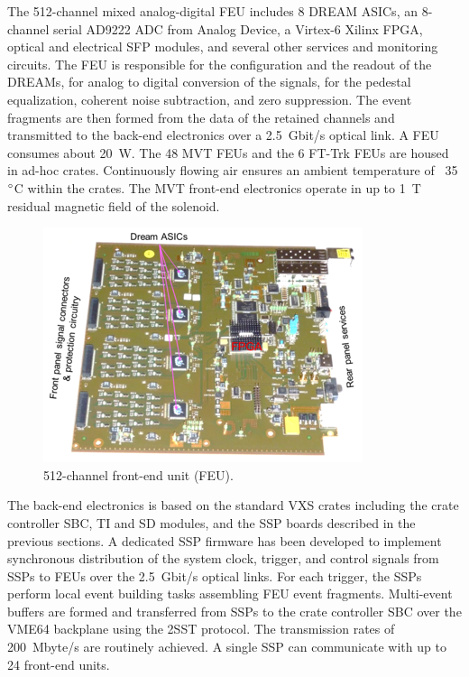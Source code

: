 The 512-channel mixed analog-digital FEU includes 8 DREAM ASICs, an 8-channel serial AD9222 ADC from Analog Device, a Virtex-6 Xilinx FPGA, optical and electrical SFP modules, and several other services and monitoring circuits. The FEU is responsible for the configuration and the readout of the DREAMs, for analog to digital conversion of the signals, for the pedestal equalization, coherent noise subtraction, and zero suppression. The event fragments are then formed from the data of the retained channels and transmitted to the back-end electronics over a 2.5~Gbit/s optical link. A FEU consumes about 20~W. The 48 MVT FEUs and the 6 FT-Trk FEUs are housed in ad-hoc crates. Continuously flowing air ensures an ambient temperature of ~35$\degree$C within the crates. The MVT front-end electronics operate in up to 1~T residual magnetic field of the solenoid.

\begin{figure}[hbt]
	\centering
	\includegraphics[width=1.0\columnwidth,keepaspectratio]{img/mvt2.png}
	\caption{512-channel front-end unit (FEU).}
	\label{fig:mvt2}
\end{figure}

The back-end electronics is based on the standard VXS crates including the crate controller SBC, TI and SD modules, and the SSP boards described in the previous sections. A dedicated SSP firmware has been developed to implement synchronous distribution of the system clock, trigger, and control signals from SSPs to FEUs over the 2.5~Gbit/s optical links. For each trigger, the SSPs perform local event building tasks assembling FEU event fragments. Multi-event buffers are formed and transferred from SSPs to the crate controller SBC over the VME64 backplane using the 2SST protocol. The transmission rates of 200~Mbyte/s are routinely achieved. A single SSP can communicate with up to 24 front-end units.

